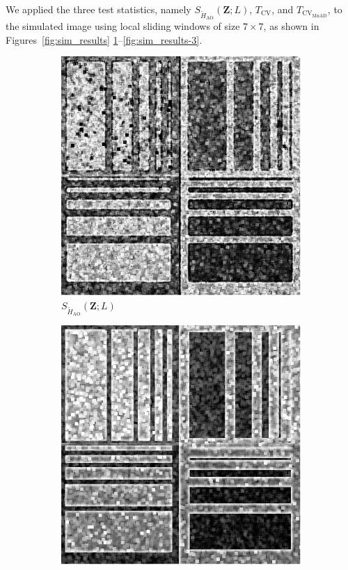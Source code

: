 We applied the three test statistics, namely
\(S_{\widetilde{H}_{\text{AO}}}(\bm{Z}; L)\), \(T_\text{CV}\), and
\(T_{\text{CV}_{\text{MnAD}}}\), to the simulated image using local
sliding windows of size \(7\times 7\), as shown in
Figures~\ref{fig:sim_results} \ref{fig:sim_results-1}--\ref{fig:sim_results-3}.
\begin{figure}[H]
  \centering
  \begin{subfigure}[b]{0.3\textwidth}
    \centering
    \includegraphics[width=\textwidth]{../../Figures/PNG/Entropy_Phantom_4_z1_200}
    \caption{$S_{\widetilde{H}_{\text{AO}}}(\bm{Z}; L)$}
    \label{fig:sim_results-1}
  \end{subfigure}
  \hfill
  \begin{subfigure}[b]{0.3\textwidth}
    \centering
    \includegraphics[width=\textwidth]{../../Figures/PNG/cv_Phantom_4_z1}

\end{subfigure}
\end{figure}
